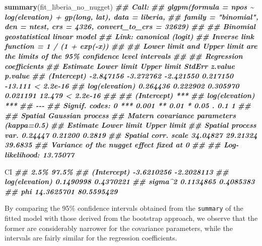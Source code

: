 \documentclass[
  letterpaper,
]{krantz}
\newenvironment{Shaded}{\begin{snugshade}}{\end{snugshade}}
\newcommand{\DocumentationTok}[1]{\textcolor[rgb]{0.56,0.35,0.01}{\textbf{\textit{#1}}}}
\newcommand{\FunctionTok}[1]{\textcolor[rgb]{0.13,0.29,0.53}{\textbf{#1}}}
\newcommand{\NormalTok}[1]{#1}
\begin{document}
\begin{Shaded}
\begin{Highlighting}[]
\FunctionTok{summary}\NormalTok{(fit\_liberia\_no\_nugget)}
\DocumentationTok{\#\# Call:}
\DocumentationTok{\#\# glgpm(formula = npos \textasciitilde{} log(elevation) + gp(long, lat), data = liberia, }
\DocumentationTok{\#\#     family = "binomial", den = ntest, crs = 4326, convert\_to\_crs = 32629)}
\DocumentationTok{\#\# }
\DocumentationTok{\#\# Binomial geostatistical linear model}
\DocumentationTok{\#\# Link: canonical (logit) }
\DocumentationTok{\#\# Inverse link function = 1 / (1 + exp({-}x)) }
\DocumentationTok{\#\#  }
\DocumentationTok{\#\# \textquotesingle{}Lower limit\textquotesingle{} and \textquotesingle{}Upper limit\textquotesingle{} are the limits of the 95\% confidence level intervals}
\DocumentationTok{\#\# }
\DocumentationTok{\#\# Regression coefficients}
\DocumentationTok{\#\#                 Estimate Lower limit Upper limit    StdErr z.value   p.value}
\DocumentationTok{\#\# (Intercept)    {-}2.847156   {-}3.272762   {-}2.421550  0.217150 {-}13.111 \textless{} 2.2e{-}16}
\DocumentationTok{\#\# log(elevation)  0.264436    0.222902    0.305970  0.021191  12.479 \textless{} 2.2e{-}16}
\DocumentationTok{\#\#                   }
\DocumentationTok{\#\# (Intercept)    ***}
\DocumentationTok{\#\# log(elevation) ***}
\DocumentationTok{\#\# {-}{-}{-}}
\DocumentationTok{\#\# Signif. codes:  0 \textquotesingle{}***\textquotesingle{} 0.001 \textquotesingle{}**\textquotesingle{} 0.01 \textquotesingle{}*\textquotesingle{} 0.05 \textquotesingle{}.\textquotesingle{} 0.1 \textquotesingle{} \textquotesingle{} 1}
\DocumentationTok{\#\# }
\DocumentationTok{\#\# Spatial Gaussian process}
\DocumentationTok{\#\# Matern covariance parameters (kappa=0.5)}
\DocumentationTok{\#\#                      Estimate Lower limit Upper limit}
\DocumentationTok{\#\# Spatial process var.  0.24447     0.21200      0.2819}
\DocumentationTok{\#\# Spatial corr. scale  34.04827    29.21324     39.6835}
\DocumentationTok{\#\# Variance of the nugget effect fixed at 0}
\DocumentationTok{\#\# }
\DocumentationTok{\#\# Log{-}likelihood: 13.75077}

\NormalTok{CI}
\DocumentationTok{\#\#                      2.5\%      97.5\%}
\DocumentationTok{\#\# (Intercept)    {-}3.6210256 {-}2.2028113}
\DocumentationTok{\#\# log(elevation)  0.1490998  0.4370221}
\DocumentationTok{\#\# sigma\^{}2         0.1134865  0.4085383}
\DocumentationTok{\#\# phi            14.3625701 80.5595429}
\end{Highlighting}
\end{Shaded}

By comparing the 95\(\%\) confidence intervals obtained from the
\texttt{summary} of the fitted model with those derived from the
bootstrap approach, we observe that the former are considerably narrower
for the covariance parameters, while the intervals are fairly similar
for the regression coefficients.
\end{document}
